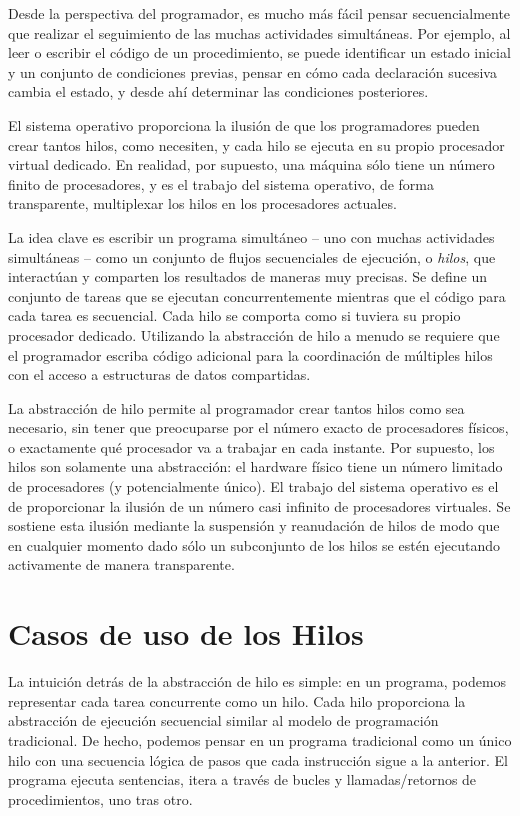 \documentclass[10pt]{book}
\begin{document}
Desde la perspectiva del programador, es mucho más fácil pensar secuencialmente que realizar el seguimiento de las muchas actividades simultáneas. Por ejemplo, al leer o escribir el código de un procedimiento, se puede identificar un estado inicial y un conjunto de condiciones previas, pensar en cómo cada declaración sucesiva cambia el estado, y desde ahí determinar las condiciones posteriores.

El sistema operativo proporciona la ilusión de que los programadores pueden crear tantos hilos, como necesiten, y cada hilo se ejecuta en su propio procesador virtual dedicado. En realidad, por supuesto, una máquina sólo tiene un número finito de procesadores, y es el trabajo del sistema operativo, de forma transparente, multiplexar los hilos en los procesadores actuales.

La idea clave es escribir un programa simultáneo -- uno con muchas actividades simultáneas -- como un conjunto de flujos secuenciales de ejecución, o \textit{hilos}, que interactúan y comparten los resultados de maneras muy precisas. Se define un conjunto de tareas que se ejecutan concurrentemente mientras que el código para cada tarea es secuencial. Cada hilo se comporta como si tuviera su propio procesador dedicado. Utilizando la abstracción de hilo a menudo se requiere que el programador escriba código adicional para la coordinación de múltiples hilos con el acceso a estructuras de datos compartidas.

La abstracción de hilo permite al programador crear tantos hilos como sea necesario, sin tener que preocuparse por el número exacto de procesadores físicos, o exactamente qué procesador va a trabajar en cada instante. Por supuesto, los hilos son solamente una abstracción: el hardware físico tiene un número limitado de procesadores (y potencialmente único). El trabajo del sistema operativo es el de proporcionar la ilusión de un número casi infinito de procesadores virtuales. Se sostiene esta ilusión mediante la suspensión y reanudación de hilos de modo que en cualquier momento dado sólo un subconjunto de los hilos se estén ejecutando activamente de manera transparente.

\section{Casos de uso de los Hilos}
La intuición detrás de la abstracción de hilo es simple: en un programa, podemos representar cada tarea concurrente como un hilo. Cada hilo proporciona la abstracción de ejecución secuencial similar al modelo de programación tradicional. De hecho, podemos pensar en un programa tradicional como un único hilo con una secuencia lógica de pasos que cada instrucción sigue a la anterior. El programa ejecuta sentencias, itera a través de bucles y llamadas/retornos de procedimientos, uno tras otro.
\end{document}
